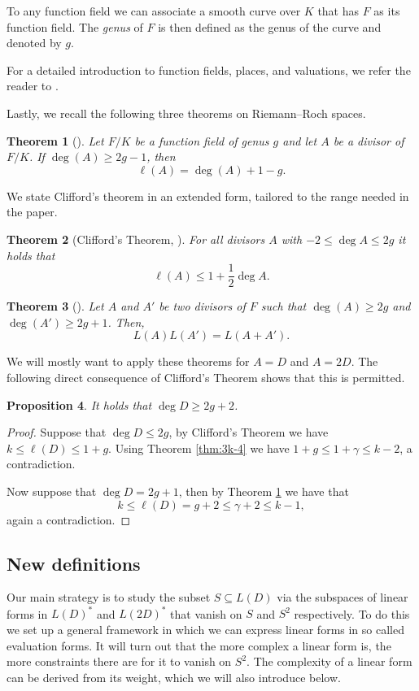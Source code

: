 \documentclass[12pt]{amsart}
\renewcommand{\leq}{\leqslant}
\renewcommand{\geq}{\geqslant}
\newtheorem{theorem}{Theorem}[section]
\newtheorem{proposition}[theorem]{Proposition}
\theoremstyle{definition}
\begin{document}
	To any function field we can associate a smooth curve over $K$ that has $F$ as its function field. The \textit{genus} of $F$ is then defined as the genus of the curve and denoted by $g$.
	
	For a detailed introduction to function fields, places, and valuations, we refer the reader to \cite{stichtenoth2009algfuncfields}.
	
	Lastly, we recall the following three theorems on Riemann--Roch spaces.
	\begin{theorem}[{\cite[Thm.~1.5.17]{stichtenoth2009algfuncfields}}]\label{thm:RR}
		Let $F/K$ be a function field of genus $g$ and let $A$ be a divisor of $F/K$.
		If $\deg(A)\ge 2g-1$, then
		$$\ell(A)=\deg(A)+1-g.$$
	\end{theorem}
	
	We state Clifford's theorem in an extended form, tailored to the range needed in the paper.
	
	\begin{theorem}[Clifford's Theorem, {\cite[Thm.~1.6.13]{stichtenoth2009algfuncfields}} ]
		For all divisors $A$ with $-2\le \deg A \le 2g$ it holds that
		$$ \ell (A) \le 1+\frac{1}{2} \deg A . $$
	\end{theorem}
	
	\begin{theorem}[{\cite[Thm.~6]{Mumford2011}}]
		Let $A$ and $A'$ be two divisors of $F$ such that $\deg(A) \geq 2g$ and $\deg(A') \geq 2g+1$. Then,
		$$L(A)L(A') = L(A + A').$$ 
	\end{theorem}
	
	We will mostly want to apply these theorems for $A = D$ and $A= 2D$. The following direct consequence of Clifford's Theorem shows that this is permitted. 
	
	\begin{proposition}
		It holds that $\deg D \geq 2g+2$. 
	\end{proposition}
	\begin{proof}
		Suppose that $\deg D \leq 2g$, by Clifford's Theorem we have 
		$k \leq \ell(D) \leq 1 + g.$ Using Theorem \ref{thm:3k-4} we have $1 + g \leq 1 + \gamma \leq k - 2$, a contradiction. 
		
		Now suppose that $\deg D = 2g + 1$, then by Theorem \ref{thm:RR} we have that 
		$$ k \leq \ell(D) = g + 2 \leq \gamma + 2 \leq k - 1,$$ again a contradiction.
	\end{proof}
	
	\subsection{New definitions} \label{Sec:defs}
	Our main strategy is to study the subset $S\subseteq L(D)$ via the subspaces of linear forms in $L(D)^\ast$ and $L(2D) ^\ast$ that vanish on $S$ and $S^2$ respectively. To do this we set up a general framework in which we can express linear forms in so called evaluation forms. It will turn out that the more complex a linear form is, the more constraints there are for it to vanish on $S^2$. The complexity of a linear form can be derived from its weight, which we will also introduce below.
	
\end{document}
